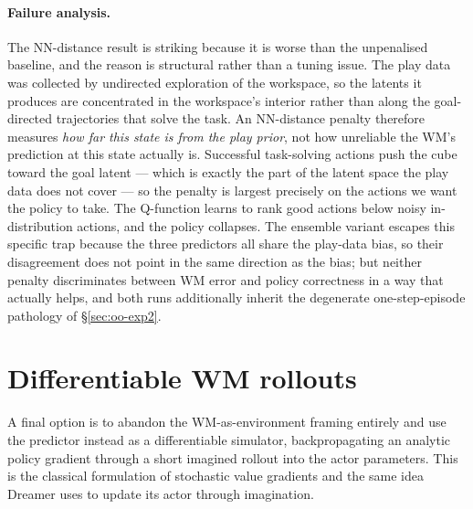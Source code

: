 \paragraph{Failure analysis.} The NN-distance result is striking because it is worse than the unpenalised baseline, and the reason is structural rather than a tuning issue. The play data was collected by undirected exploration of the workspace, so the latents it produces are concentrated in the workspace's interior rather than along the goal-directed trajectories that solve the task. An NN-distance penalty therefore measures \emph{how far this state is from the play prior}, not how unreliable the WM's prediction at this state actually is. Successful task-solving actions push the cube toward the goal latent --- which is exactly the part of the latent space the play data does not cover --- so the penalty is largest precisely on the actions we want the policy to take. The Q-function learns to rank good actions below noisy in-distribution actions, and the policy collapses. The ensemble variant escapes this specific trap because the three predictors all share the play-data bias, so their disagreement does not point in the same direction as the bias; but neither penalty discriminates between WM error and policy correctness in a way that actually helps, and both runs additionally inherit the degenerate one-step-episode pathology of \S\ref{sec:oo-exp2}.

\section{Differentiable WM rollouts}
\label{sec:oo-exp8}

A final option is to abandon the WM-as-environment framing entirely and use the predictor instead as a differentiable simulator, backpropagating an analytic policy gradient through a short imagined rollout into the actor parameters. This is the classical formulation of stochastic value gradients \cite{heess2015svg} and the same idea Dreamer \cite{hafner2020dreamer} uses to update its actor through imagination.

